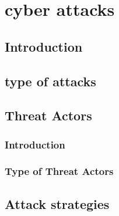 \section{cyber attacks}
\subsection{Introduction}
\subsection{type of attacks}
\subsection{Threat Actors}
\subsubsection{Introduction}
\subsubsection{Type of Threat Actors}
\subsection{Attack strategies}
